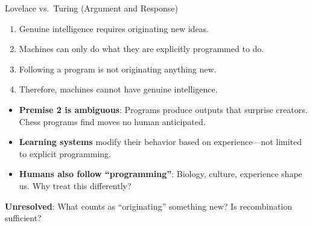 \documentclass[aspectratio=169,11pt]{beamer}
\begin{document}
\begin{frame}{Lovelace vs.\ Turing (Argument and Response)}
\begin{objectionbox}
\scriptsize
\begin{enumerate}
    \item Genuine intelligence requires originating new ideas.
    \item Machines can only do what they are explicitly programmed to do.
    \item Following a program is not originating anything new.
    \item Therefore, machines cannot have genuine intelligence.
\end{enumerate}
\end{objectionbox}

\begin{probox}
\scriptsize
\begin{itemize}
    \item \textbf{Premise 2 is ambiguous}: Programs produce outputs that surprise creators. Chess programs find moves no human anticipated.
    \item \textbf{Learning systems} modify their behavior based on experience---not limited to explicit programming.
    \item \textbf{Humans also follow ``programming''}: Biology, culture, experience shape us. Why treat this differently?
\end{itemize}
\end{probox}

{\small \textbf{Unresolved}: What counts as ``originating'' something new? Is recombination sufficient?}
\end{frame}
\end{document}
